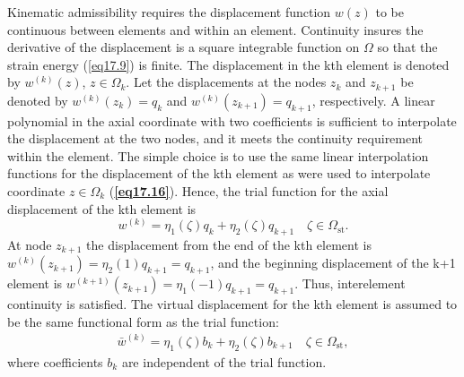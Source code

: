 \documentclass{AeroStructure-ERJohnson}
\begin{document}
Kinematic admissibility requires the displacement function $w(z)$ to be continuous between elements and within an element. Continuity insures the derivative of the displacement is a square integrable function on $\Omega$ so that the strain energy (\ref{eq17.9}) is finite. The displacement in the kth element is denoted by $w^{(k)}(z)$, $z \in \Omega_{k}$. Let the displacements at the nodes $z_{k}$ and $z_{k+1}$ be denoted by $w^{(k)}\left(z_{k}\right)=q_{k}$ and $w^{(k)}\left(z_{k+1}\right)=q_{k+1}$, respectively. A linear polynomial in the axial coordinate with two coefficients is sufficient to interpolate the displacement at the two nodes, and it meets the continuity requirement within the element. The simple choice is to use the same linear interpolation functions for the displacement of the kth element as were used to interpolate coordinate $z \in \Omega_{k}$ (\textbf{\ref{eq17.16}}). Hence, the trial function for the axial displacement of the kth element is
\begin{equation}
w^{(k)}=\eta_{1}(\zeta) q_{k}+\eta_{2}(\zeta) q_{k+1} \quad \zeta \in \Omega_{\mathrm{st}}. \label{eq17.19}
\end{equation}
At node $z_{k+1}$ the displacement from the end of the kth element is $w^{(k)}\left(z_{k+1}\right)=\eta_{2}(1) q_{k+1}=q_{k+1}$, and the beginning displacement of the k+1 element is $w^{(k+1)}\left(z_{k+1}\right)=\eta_{1}(-1) q_{k+1}=q_{k+1}$. Thus, interelement continuity is satisfied. The virtual displacement for the kth element is assumed to be the same functional form as the trial function:
\begin{align}\label{eq17.20}
\bar{w}^{(k)}=\eta_{1}(\zeta) b_{k}+\eta_{2}(\zeta) b_{k+1} \quad \zeta \in \Omega_{\mathrm{st}},
\end{align}
where coefficients $b_{k}$ are independent of the trial function.
\end{document}
